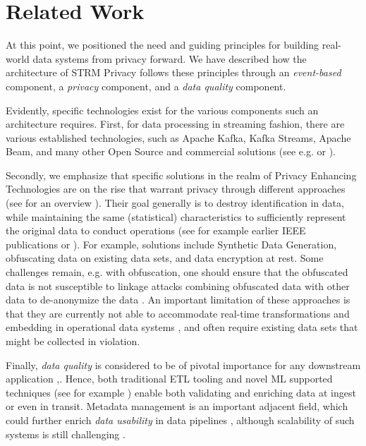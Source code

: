 \documentclass[11pt]{article} %
\begin{document}
\section{Related Work}
At this point, we positioned the need and guiding principles for building real-world data systems from privacy forward. We have described how the architecture of STRM Privacy follows these principles through an \textit{event-based} component, a \textit{privacy} component, and a \textit{data quality} component. 

Evidently, specific technologies exist for the various components such an architecture requires. First, for data processing in streaming fashion, there are various established technologies, such as Apache Kafka, Kafka Streams, Apache Beam, and many other Open Source and commercial solutions (see e.g. \cite{isah2019survey} or \cite{mehmood2020challenges}).

Secondly, we emphasize that specific solutions in the realm of Privacy Enhancing Technologies are on the rise that warrant privacy through different approaches (see for an overview \cite{Polonetsky2021review}). Their goal generally is to destroy identification in data, while maintaining the same (statistical) characteristics to sufficiently represent the original data to conduct operations (see for example earlier IEEE publications \cite{li2007t} or \cite{zhou2008brief}). For example, solutions include Synthetic Data Generation, obfuscating data on existing data sets, and data encryption at rest. Some challenges remain, e.g. with obfuscation, one should ensure that the obfuscated data is not susceptible to linkage attacks combining obfuscated data with other data to de-anonymize the data \cite{merener2012theoretical}. An important limitation of these approaches is that they are currently not able to accommodate real-time transformations and embedding in operational data systems \cite{anderson2014synthetic}, and often require existing data sets that might be collected in violation. 

Finally, \textit{data quality} is considered to be of pivotal importance for any downstream application \cite{cai2015challenges},\cite{breck2019data}. Hence, both traditional ETL tooling and novel ML supported techniques (see for example \cite{grafberger2021lightweight}) enable both validating and enriching data at ingest or even in transit. Metadata management is an important adjacent field, which could further enrich \textit{data usability} in data pipelines \cite{sawadogo2021data}, although scalability of such systems is still challenging \cite{singh2018scalable}. 
\end{document}

